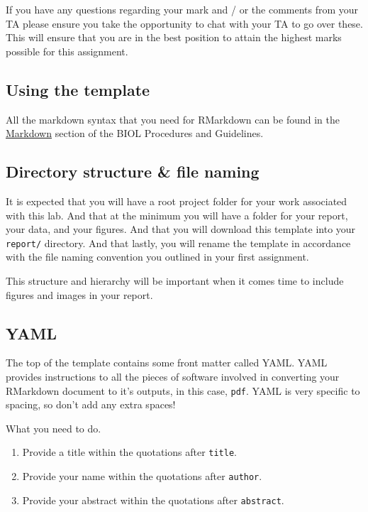 \documentclass[
]{book}
\providecommand{\tightlist}{%
  \setlength{\itemsep}{0pt}\setlength{\parskip}{0pt}}
\begin{document}
If you have any questions regarding your mark and / or the comments from your TA please ensure you take the opportunity to chat with your TA to go over these. This will ensure that you are in the best position to attain the highest marks possible for this assignment.

\hypertarget{using-the-template}{%
\subsection*{Using the template}\label{using-the-template}}

All the markdown syntax that you need for RMarkdown can be found in the \href{https://ubco-biology.github.io/Procedures-and-Guidelines/markdown-1.html}{Markdown} section of the BIOL Procedures and Guidelines.

\hypertarget{directory-structure-file-naming}{%
\subsection*{Directory structure \& file naming}\label{directory-structure-file-naming}}

It is expected that you will have a root project folder for your work associated with this lab. And that at the minimum you will have a folder for your report, your data, and your figures. And that you will download this template into your \texttt{report/} directory. And that lastly, you will rename the template in accordance with the file naming convention you outlined in your first assignment.

This structure and hierarchy will be important when it comes time to include figures and images in your report.

\hypertarget{yaml}{%
\subsection*{YAML}\label{yaml}}

The top of the template contains some front matter called YAML. YAML provides instructions to all the pieces of software involved in converting your RMarkdown document to it's outputs, in this case, \texttt{pdf}. YAML is very specific to spacing, so don't add any extra spaces!

What you need to do.

\begin{enumerate}
\def\labelenumi{\arabic{enumi}.}
\tightlist
\item
  Provide a title within the quotations after \texttt{title}.
\item
  Provide your name within the quotations after \texttt{author}.
\item
  Provide your abstract within the quotations after \texttt{abstract}.
\end{enumerate}
\end{document}
